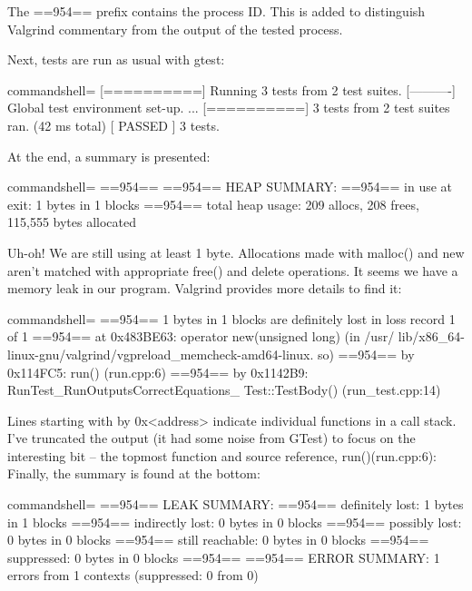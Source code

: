 The ==954== prefix contains the process ID. This is added to distinguish Valgrind commentary from the output of the tested process.

Next, tests are run as usual with gtest:

\begin{tcblisting}{commandshell={}}
[==========] Running 3 tests from 2 test suites.
[----------] Global test environment set-up.
...
[==========] 3 tests from 2 test suites ran. (42 ms total)
[ PASSED ] 3 tests.
\end{tcblisting}

At the end, a summary is presented:

\begin{tcblisting}{commandshell={}}
==954==
==954== HEAP SUMMARY:
==954== in use at exit: 1 bytes in 1 blocks
==954== total heap usage: 209 allocs, 208 frees, 115,555
bytes allocated
\end{tcblisting}

Uh-oh! We are still using at least 1 byte. Allocations made with malloc() and new aren't matched with appropriate free() and delete operations. It seems we have a memory leak in our program. Valgrind provides more details to find it:

\begin{tcblisting}{commandshell={}}
==954== 1 bytes in 1 blocks are definitely lost in loss record
1 of 1
==954== at 0x483BE63: operator new(unsigned long) (in /usr/
lib/x86_64-linux-gnu/valgrind/vgpreload_memcheck-amd64-linux.
so)
==954== by 0x114FC5: run() (run.cpp:6)
==954== by 0x1142B9: RunTest_RunOutputsCorrectEquations_
Test::TestBody() (run_test.cpp:14)
\end{tcblisting}

Lines starting with by 0x<address> indicate individual functions in a call stack. I've truncated the output (it had some noise from GTest) to focus on the interesting bit – the topmost function and source reference, run()(run.cpp:6): Finally, the summary is found at the bottom:

\begin{tcblisting}{commandshell={}}
==954== LEAK SUMMARY:
==954==     definitely lost: 1 bytes in 1 blocks
==954==     indirectly lost: 0 bytes in 0 blocks
==954==       possibly lost: 0 bytes in 0 blocks
==954==     still reachable: 0 bytes in 0 blocks
==954==          suppressed: 0 bytes in 0 blocks
==954==
==954== ERROR SUMMARY: 1 errors from 1 contexts (suppressed: 0
from 0)
\end{tcblisting}

